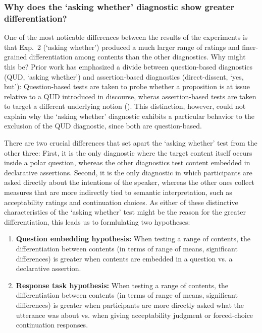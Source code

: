 \documentclass[times,linguex,xcolor]{glossa}
\begin{document}
    \subsubsection{Why does the `asking whether' diagnostic show greater differentiation?}
      One of the most noticable differences between the results of the experiments is that Exp.~2 (`asking whether') produced a much larger range of ratings and finer-grained differentiation among contents than the other diagnostics. Why might this be?
      Prior work has emphasized a divide between question-based diagnostics (QUD, `asking whether') and assertion-based diagnostics (direct-dissent, `yes, but'): Question-based tests are taken to probe whether a proposition is at issue relative to a QUD introduced in discourse, wheras assertion-based tests are taken to target a different underlying notion (\citealt{snider_anaphoric_2017,snider_at-issueness_2017,snider_distinguishing_2018,koev_notions_2018,faller_discourse_2019,korotkova_evidential_2020}). This distinction, however, could not explain why the `asking whether' diagnostic exhibits a particular behavior to the exclusion of the QUD diagnostic, since both are question-based.

      There are two crucial differences that set apart the `asking whether' test from the other three: First, it is the only diagnostic where the target content itself occurs inside a polar question, whereas the other diagnostics test content embedded in declarative assertions. Second, it is the only diagnostic in which participants are asked directly about the intentions of the speaker, whereas the other ones collect measures that are more indirectly tied to semantic interpretation, such as acceptability ratings and continuation choices. As either of these distinctive characteristics of the `asking whether' test might be the reason for the greater differentiation, this leads us to formlulating two hypotheses:

      \begin{enumerate}
        \item \textbf{Question embedding hypothesis:} When testing a range of contents, the differentiation between contents (in terms of range of means, significant differences) is greater when contents are embedded in a question vs. a declarative assertion.

        \item \textbf{Response task hypothesis:} When testing a range of contents, the differentiation between contents (in terms of range of means, significant differences) is greater when participants are more directly asked what the utterance was about vs. when giving acceptability judgment or forced-choice continuation responses.

      \end{enumerate}
\end{document}
